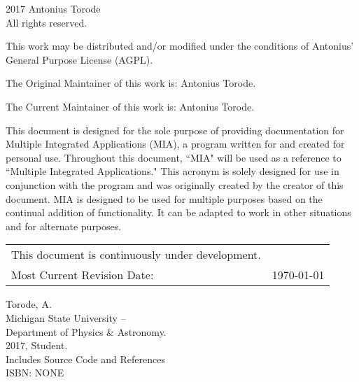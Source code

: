 \pagestyle{empty}
\begingroup
\footnotesize
\parindent 0pt
\parskip \baselineskip
\textcopyright{} 2017 Antonius Torode \\
All rights reserved.

This work may be distributed and/or modified under the conditions of Antonius’ General Purpose License (AGPL).

The Original Maintainer of this work is: Antonius Torode.

The Current Maintainer of this work is: Antonius Torode.

This document is designed for the sole purpose of providing documentation for Multiple Integrated Applications (MIA), a program written for and created for personal use. Throughout this document, ``MIA" will be used as a reference to ``Multiple Integrated Applications." This acronym is solely designed for use in conjunction with the program and was originally created by the creator of this document. MIA is designed to be used for multiple purposes based on the continual addition of functionality. It can be adapted to work in other situations and for alternate purposes.


\begin{center}
\begin{tabular}{ll}
This document is continuously under development. \\
Most Current Revision Date: &  \today 
\end{tabular}
\end{center}

\vfill

Torode, A.\\
\hspace*{2em} Michigan State University -- \\
\hspace*{2em} Department of Physics \& Astronomy. \\
\hspace*{2em} 2017, Student. \\
\hspace*{2em} Includes Source Code and References \\
\hspace*{2em} ISBN: NONE \\



\endgroup
\clearpage